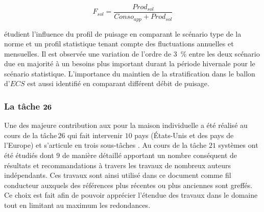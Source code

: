 \begin{equation}\label{eq:f_sol}
    F_{sol} = \frac{Prod_{sol}}{Conso_{app} + Prod_{sol}}
\end{equation}

\textcite{Jordan2001197} étudient l’influence du profil de puisage en comparant le
scénario type de la norme  et un profil statistique tenant compte
des fluctuations annuelles et mensuelles. Il est observée une variation de l’ordre
de \SI{3}{\percent} entre les deux scénario due en majorité à un besoins plus
important durant la période hivernale pour le scénario statistique.
L’importance du maintien de la stratification dans le ballon d’$ECS$ est aussi identifié
en comparant différent débit de puisage.


\subsubsection{La tâche $\bf{26}$} %
\label{ssub:la_tâche_26}
Une des majeure contribution aux  pour la maison individuelle a été réalisé au cours
de la tâche\,$26$ qui fait intervenir $10$ pays (États-Unis et des pays de l’Europe)
et s’articule en trois sous-tâches \parencite{Task26C2003}. Au cours
de la tâche $21$ systèmes ont été étudiés dont $9$ de manière détaillé apportant
un nombre conséquent de résultats et recommandations à travers les travaux de nombreux
auteurs indépendants.
Ces travaux sont ainsi utilisé dans ce document comme fil conducteur auxquels des
références plus récentes ou plus anciennes sont greffés. Ce choix est fait afin
de pouvoir apprécier l’étendue des travaux dans le domaine tout en limitant au
maximum les redondances.

